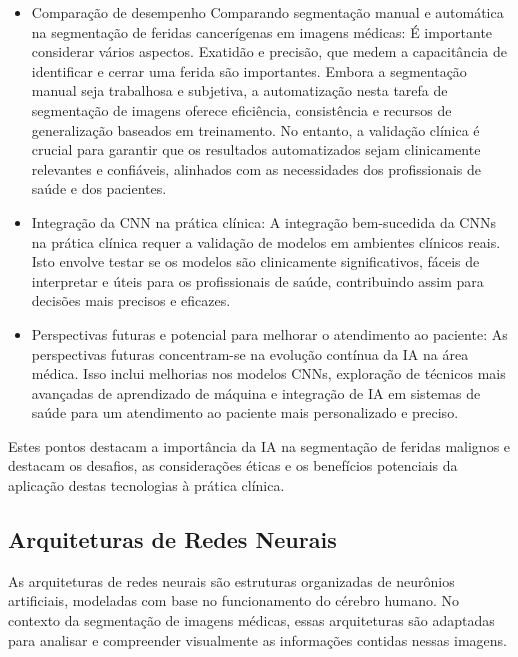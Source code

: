 \begin{itemize}
    \item Comparação de desempenho Comparando segmentação manual e automática na segmentação de feridas cancerígenas em imagens médicas: É importante considerar vários aspectos. Exatidão e precisão, que medem a capacitância de identificar e cerrar uma ferida são importantes. Embora a segmentação manual seja trabalhosa e subjetiva, a automatização nesta tarefa de segmentação de imagens oferece eficiência, consistência e recursos de generalização baseados em treinamento. No entanto, a validação clínica é crucial para garantir que os resultados automatizados sejam clinicamente relevantes e confiáveis, alinhados com as necessidades dos profissionais de saúde e dos pacientes.

    \item Integração da \ac{CNN} na prática clínica: A integração bem-sucedida da \acp{CNN} na prática clínica requer a validação de modelos em ambientes clínicos reais. Isto envolve testar se os modelos são clinicamente significativos, fáceis de interpretar e úteis para os profissionais de saúde, contribuindo assim para decisões mais precisos e eficazes.

    \item Perspectivas futuras e potencial para melhorar o atendimento ao paciente: As perspectivas futuras concentram-se na evolução contínua da IA na área médica. Isso inclui melhorias nos modelos \acp{CNN}, exploração de técnicos mais avançadas de aprendizado de máquina e integração de \ac{IA} em sistemas de saúde para um atendimento ao paciente mais personalizado e preciso.
    
\end{itemize}

Estes pontos destacam a importância da \ac{IA} na segmentação de feridas malignos e destacam os desafios, as considerações éticas e os benefícios potenciais da aplicação destas tecnologias à prática clínica.

\subsection{Arquiteturas de Redes Neurais}

As arquiteturas de redes neurais são estruturas organizadas de neurônios artificiais, modeladas com base no funcionamento do cérebro humano. No contexto da segmentação de imagens médicas, essas arquiteturas são adaptadas para analisar e compreender visualmente as informações contidas nessas imagens.  

